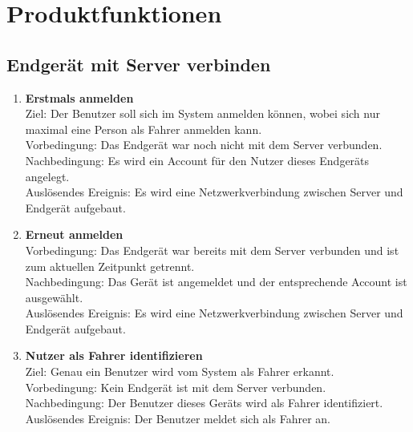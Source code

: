 \documentclass[pflichtenheft.tex]{subfiles}
\begin{document}
\chapter{Produktfunktionen}

\renewcommand{\theenumi}{/FA\ifnum \value{enumi}<10 0\fi\arabic{enumi}0/}
\renewcommand{\labelenumi}{\theenumi}
\renewcommand{\theenumii}{\arabic{enumii}}
\renewcommand{\labelenumii}{/FA\ifnum \value{enumi}<10 0\fi\arabic{enumi}\arabic{enumii}/}

\section{Endgerät mit Server verbinden}

	\begin{enumerate}
		\item{\textbf{Erstmals anmelden}} \label{firstcon}
		\\ Ziel: Der Benutzer soll sich im System anmelden können, wobei sich nur maximal eine Person als Fahrer anmelden kann. \\
		Vorbedingung: Das Endgerät war noch nicht mit dem Server verbunden.\\
		Nachbedingung: Es wird ein Account für den Nutzer dieses Endgeräts angelegt.\\
		Auslösendes Ereignis: Es wird eine Netzwerkverbindung zwischen Server und Endgerät aufgebaut.

		\item{\textbf{Erneut anmelden}} \label{connection}
		\\Vorbedingung: Das Endgerät war bereits mit dem Server verbunden und ist zum aktuellen Zeitpunkt getrennt. \\
		Nachbedingung: Das Gerät ist angemeldet und der entsprechende Account ist ausgewählt.\\
		Auslösendes Ereignis: Es wird eine Netzwerkverbindung zwischen Server und Endgerät aufgebaut.

		\item{\textbf{Nutzer als Fahrer identifizieren}} \label{driver1}
		\\ Ziel: Genau ein Benutzer wird vom System als Fahrer erkannt.\\
		Vorbedingung: Kein Endgerät ist mit dem Server verbunden.\\
		Nachbedingung: Der Benutzer dieses Geräts wird als Fahrer identifiziert. \\
		Auslösendes Ereignis: Der Benutzer meldet sich als Fahrer an.


\end{enumerate}
\end{document}

